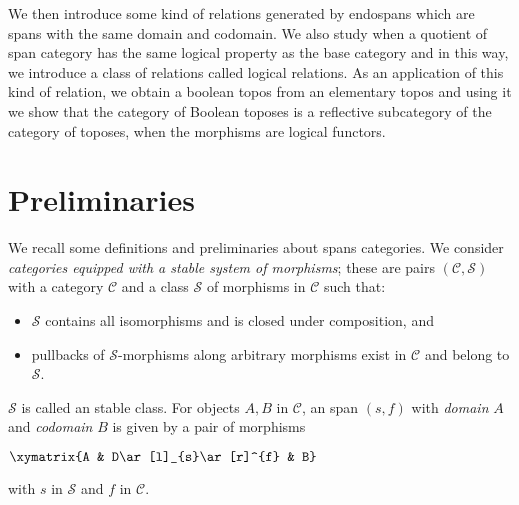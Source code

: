 \documentclass{tac}
\theoremstyle{definition}
\theoremstyle{remark}
\def\mc#1{\mathcal {#1}}
\def\C{\mc C}
\def\S{\mc S}
\begin{document}
	We then introduce some kind of relations generated by endospans which are spans with the same domain and codomain. We also study when a quotient of span category has the same logical property as the base category and in this way, we introduce a class of relations called logical relations. As an application of this kind of relation, we obtain a boolean topos from an elementary topos and using it we show that the category of Boolean toposes is a reflective subcategory of the category of toposes,
when  the morphisms are logical functors.


\section{Preliminaries}
We recall some definitions and preliminaries about spans categories.
We consider {\em categories equipped with a stable system of morphisms}; these are pairs $(\C,\S)$ with a category $\C$ and a class $\mathcal{S}$ of morphisms in $\C$ such that:
\begin{itemize}
	\item
	$\S$ contains all isomorphisms and is closed under composition, and
	\item
	pullbacks of $\S$-morphisms along arbitrary morphisms exist in $\C$ and belong to $\S$.
\end{itemize}
$\S$ is called an stable class.
For objects $A,B$ in $\C$, an span $(s,f)$ with {\em domain} $A$ and {\em codomain} $B$ is given by a pair of morphisms
\begin{center}
	$\xymatrix{A & D\ar[l]_{s}\ar[r]^{f} & B}$
\end{center}
with $s$ in $\S$ and $f$ in $\C$.
\end{document}
